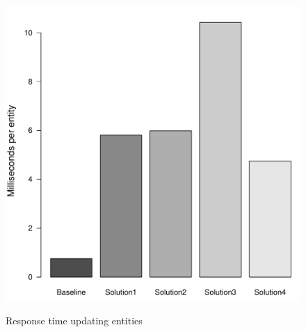 \begin{landscape}
\begin{figure}
			{\includegraphics[width=\W]{figure/result/barplot-update_course-rt.pdf}}
			\caption{Response time updating entities}\label{fres:update-response-time}
			

\end{figure}
\end{landscape}
